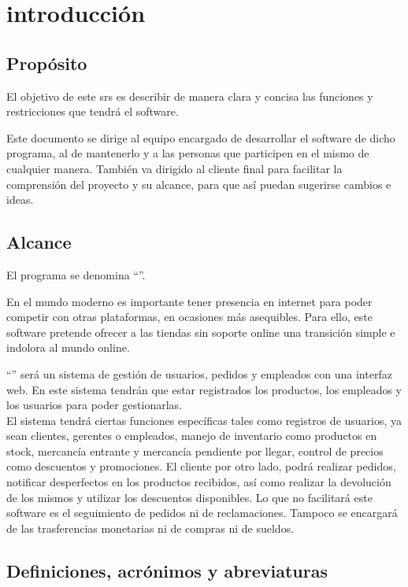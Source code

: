 \section{introducción}
\subsection{Propósito}
El objetivo de este \gls{srs} es describir de manera clara y concisa las funciones y restricciones que tendrá el software.

Este documento se dirige al equipo encargado de desarrollar el software de dicho programa, al de mantenerlo y a las personas que participen en el mismo de cualquier manera. También va dirigido al cliente final para facilitar la comprensión del proyecto y su alcance, para que así puedan sugerirse cambios e ideas.
\subsection{Alcance}
El programa se denomina ``\nombredelproyecto''.

En el mundo moderno es importante tener presencia en internet para poder competir con otras plataformas, en ocasiones más asequibles. Para ello, este software pretende ofrecer a las tiendas sin soporte online una transición simple e indolora al mundo online.

``\nombredelproyecto'' será un sistema de gestión de usuarios, pedidos y empleados con una interfaz web. En este sistema tendrán que estar registrados los productos, los empleados y los usuarios para poder gestionarlas.\\
El sistema tendrá ciertas funciones específicas tales como registros de usuarios, ya sean clientes, gerentes o empleados, manejo de inventario como productos en stock, mercancía entrante y mercancía pendiente por llegar, control de precios como descuentos y promociones. El cliente por otro lado, podrá realizar pedidos, notificar desperfectos en los productos recibidos, así como realizar la devolución de los mismos y utilizar los descuentos disponibles.
Lo que no facilitará este software es el seguimiento de pedidos ni de reclamaciones. Tampoco se encargará de las trasferencias monetarias ni de compras ni de sueldos.

\glsaddall
\nocite{*}
\subsection{Definiciones, acrónimos y abreviaturas}
{
	\printglossary}


